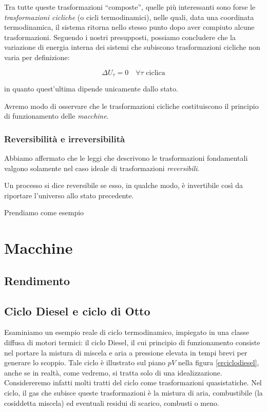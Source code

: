 Tra tutte queste trasformazioni ``composte'', quelle più interessanti
sono forse le \textit{trasformazioni cicliche} (o cicli termodinamici), nelle
quali, data una coordinata termodinamica, il sistema ritorna nello stesso
punto dopo aver compiuto alcune trasformazioni. Seguendo i nostri presupposti,
possiamo concludere che la variazione di energia interna dei sistemi che
subiscono trasformazioni cicliche non varia per definizione:

\[ \Delta U_\tau = 0 \quad \forall \tau \text{ ciclica} \]

\noindent in quanto quest'ultima dipende unicamente dallo stato.

Avremo modo di osservare che le trasformazioni cicliche costituiscono
il principio di funzionamento delle \textit{macchine}.


\subsubsection*{Reversibilità e irreversibilità}
Abbiamo affermato che le leggi che descrivono le trasformazioni fondamentali
valgono solamente nel caso ideale di trasformazioni \textit{reversibili}.

\begin{tcolorbox}[colback = yellow!30, colframe = yellow!30!black, title = {Trasformazioni reversibili}]
    Un processo si dice reversibile se esso, in qualche modo, è
    invertibile così da riportare l'universo allo stato
    precedente.
\end{tcolorbox}

\noindent Prendiamo come esempio




\section{Macchine}

\subsection{Rendimento}


\subsection{Ciclo Diesel e ciclo di Otto}
Esaminiamo un esempio reale di ciclo termodinamico, impiegato in
una classe diffusa di motori termici: il ciclo Diesel, il cui
principio di funzionamento consiste nel portare la mistura di
miscela e aria a pressione elevata in tempi brevi per generare
lo scoppio. Tale ciclo
è illustrato sul piano $pV$ nella figura \ref{erciclodiesel}, anche
se in realtà, come vedremo, si tratta solo di una idealizzazione.
Considereremo infatti molti tratti del ciclo come trasformazioni
quasistatiche. Nel ciclo, il gas che subisce queste trasformazioni
è la mistura di aria, combustibile (la cosiddetta miscela) ed
eventuali residui di scarico, combusti o meno.

